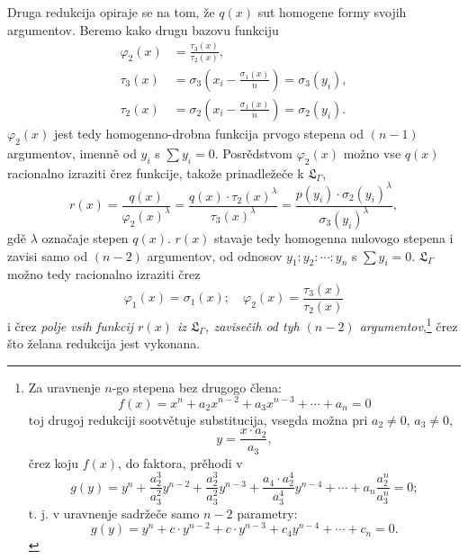\documentclass[11pt]{article}
\begin{document}
Druga redukcija opiraje se na tom, že $q(x)$ sut homogene formy svojih argumentov. Beremo kako drugu bazovu funkciju
\[
\begin{aligned}
\varphi_2(x)&=\frac{\tau_3(x)}{\tau_2(x)},\\
\tau_3(x)&=\sigma_3\left(x_i-\frac{\sigma_1(x)}{n}\right)=\sigma_3(y_i),\\
\tau_2(x)&=\sigma_2\left(x_i-\frac{\sigma_1(x)}{n}\right)=\sigma_2(y_i).
\end{aligned}
\]
$\varphi_2(x)$ jest tedy homogenno-drobna funkcija prvogo stepena od $(n-1)$ argumentov, imenně od $y_i$ s $\sum y_i=0$. Posrědstvom $\varphi_2(x)$ možno vse $q(x)$ racionalno izraziti črez funkcije, takože prinadležeče k $\mathfrak L_\Gamma$,
\[
r(x)=\frac{q(x)}{\varphi_2(x)^\lambda}=\frac{q(x)\cdot\tau_2(x)^\lambda}{\tau_3(x)^\lambda}=\frac{p(y_i)\cdot\sigma_2(y_i)^\lambda}{\sigma_3(y_i)^\lambda},
\]
gdě $\lambda$ označaje stepen $q(x)$. $r(x)$ stavaje tedy homogenna nulovogo stepena i zavisi samo od $(n-2)$ argumentov, od odnosov $y_1:y_2:\cdots:y_n$ s $\sum y_i=0$. $\mathfrak L_\Gamma$ možno tedy racionalno izraziti črez
\[
\varphi_1(x)=\sigma_1(x);\quad \varphi_2(x)=\frac{\tau_3(x)}{\tau_2(x)}
\]
i črez {\itshape polje vsih funkcij $r(x)$ iz $\mathfrak L_\Gamma$, zavisečih od tyh $(n-2)$ argumentov},\footnote{Za uravnenje $n$-go stepena bez drugogo člena:
\[
f(x)=x^n+a_2x^{n-2}+a_3x^{n-3}+\cdots+a_n=0
\]
toj drugoj redukciji sootvětuje substitucija, vsegda možna pri $a_2\neq0$, $a_3\neq0$,
\[
y=\frac{x\cdot a_2}{a_3},
\]
črez koju $f(x)$, do faktora, prěhodi v
\[
g(y)=y^n+\frac{a_2^3}{a_3^2}y^{n-2}+\frac{a_2^3}{a_3^2}y^{n-3}+\frac{a_4\cdot a_2^4}{a_3^4}y^{n-4}+\cdots+a_n\frac{a_2^n}{a_3^n}=0;
\]
t. j. v uravnenje sadržeče samo $n-2$ parametry:
\[
g(y)=y^n+c\cdot y^{n-2}+c\cdot y^{n-3}+c_4y^{n-4}+\cdots+c_n=0.
\]} črez što želana redukcija jest vykonana.
\end{document}
